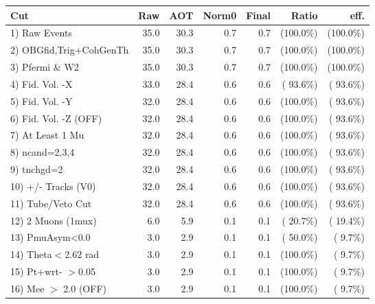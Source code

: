  \begin{table}[h!]\centering
 \begin{tabular}{||l||r|r|r|r|r|r||}
 \hline
 \hline
 Cut & Raw & AOT & Norm0 & Final & Ratio & eff.       \\
 \hline
  1) Raw Events           &         35.0 &         30.3 &          0.7 &          0.7 & (100.0\%) & (100.0\%) \\
  2) OBGfid,Trig+CohGenTh &         35.0 &         30.3 &          0.7 &          0.7 & (100.0\%) & (100.0\%) \\
  3) Pfermi \& W2         &         35.0 &         30.3 &          0.7 &          0.7 & (100.0\%) & (100.0\%) \\
  4) Fid. Vol. -X         &         33.0 &         28.4 &          0.6 &          0.6 & ( 93.6\%) & ( 93.6\%) \\
  5) Fid. Vol. -Y         &         32.0 &         28.4 &          0.6 &          0.6 & (100.0\%) & ( 93.6\%) \\
  6) Fid. Vol. -Z (OFF)   &         32.0 &         28.4 &          0.6 &          0.6 & (100.0\%) & ( 93.6\%) \\
  7) At Least 1 Mu        &         32.0 &         28.4 &          0.6 &          0.6 & (100.0\%) & ( 93.6\%) \\
  8) ncand=2,3,4          &         32.0 &         28.4 &          0.6 &          0.6 & (100.0\%) & ( 93.6\%) \\
  9) tnchgd=2             &         32.0 &         28.4 &          0.6 &          0.6 & (100.0\%) & ( 93.6\%) \\
 10) +/- Tracks (V0)      &         32.0 &         28.4 &          0.6 &          0.6 & (100.0\%) & ( 93.6\%) \\
 11) Tube/Veto Cut        &         32.0 &         28.4 &          0.6 &          0.6 & (100.0\%) & ( 93.6\%) \\
 12) 2 Muons (1mux)       &          6.0 &          5.9 &          0.1 &          0.1 & ( 20.7\%) & ( 19.4\%) \\
 13) PmuAsym<0.0          &          3.0 &          2.9 &          0.1 &          0.1 & ( 50.0\%) & (  9.7\%) \\
 14) Theta$<$2.62 rad     &          3.0 &          2.9 &          0.1 &          0.1 & (100.0\%) & (  9.7\%) \\
 15) Pt+wrt- $>$0.05      &          3.0 &          2.9 &          0.1 &          0.1 & (100.0\%) & (  9.7\%) \\
 16) Mee $>$ 2.0  (OFF)   &          3.0 &          2.9 &          0.1 &          0.1 & (100.0\%) & (  9.7\%) \\

\end{tabular}
\end{table}

